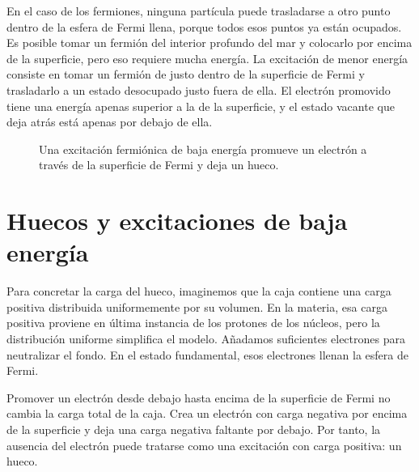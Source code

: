 En el caso de los fermiones, ninguna partícula puede trasladarse a otro punto dentro de la esfera de Fermi llena, porque todos esos puntos ya están ocupados. Es posible tomar un fermión del interior profundo del mar y colocarlo por encima de la superficie, pero eso requiere mucha energía. La excitación de menor energía consiste en tomar un fermión de justo dentro de la superficie de Fermi y trasladarlo a un estado desocupado justo fuera de ella. El electrón promovido tiene una energía apenas superior a la de la superficie, y el estado vacante que deja atrás está apenas por debajo de ella.

\begin{figure}
\centering
{}
\caption{Una excitación fermiónica de baja energía promueve un electrón a través de la superficie de Fermi y deja un hueco.}
\end{figure}

\section{Huecos y excitaciones de baja energía}

Para concretar la carga del hueco, imaginemos que la caja contiene una carga positiva distribuida uniformemente por su volumen. En la materia, esa carga positiva proviene en última instancia de los protones de los núcleos, pero la distribución uniforme simplifica el modelo. Añadamos suficientes electrones para neutralizar el fondo. En el estado fundamental, esos electrones llenan la esfera de Fermi.

Promover un electrón desde debajo hasta encima de la superficie de Fermi no cambia la carga total de la caja. Crea un electrón con carga negativa por encima de la superficie y deja una carga negativa faltante por debajo. Por tanto, la ausencia del electrón puede tratarse como una excitación con carga positiva: un hueco.

\begin{classroomqa}
\end{classroomqa}


